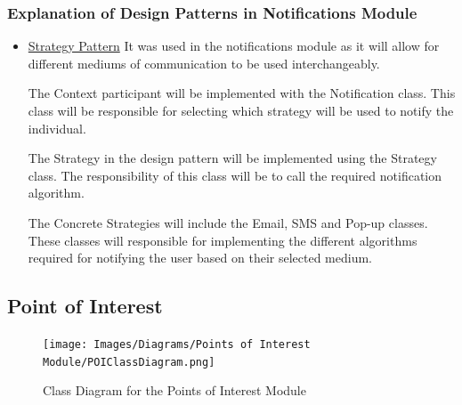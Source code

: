 \documentclass[runningheads,a4paper]{article}
\begin{document}
\subsubsection{Explanation of Design Patterns in Notifications Module}
\begin{itemize}
\item \underline{Strategy Pattern} It was used in the notifications module as it will allow for different mediums of communication to be used interchangeably.

The Context participant will be implemented with the Notification class. This class will be responsible for selecting which strategy will be used to notify the individual.

The Strategy in the design pattern will be implemented using the Strategy class. The responsibility of this class will be to call the required notification algorithm.

The Concrete Strategies will include the Email, SMS and Pop-up classes. These classes will responsible for implementing the different algorithms required for notifying the user based on their selected medium.
\end{itemize}


\subsection{Point of Interest}
\begin{figure}[H]
   	\centering
   	\texttt{[image: Images/Diagrams/Points of Interest Module/POIClassDiagram.png]}
   	\caption{Class Diagram for the Points of Interest Module}
\end{figure}
\end{document}
